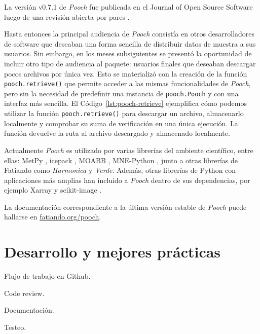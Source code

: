 La versión v0.7.1 de \emph{Pooch} fue publicada en el Journal of Open Source
Software luego de una revisión abierta por pares \citep{pooch2020}.



Hasta entonces la principal audiencia de \emph{Pooch} consistía en otros
desarrolladores de software que deseaban una forma sencilla de distribuir datos
de muestra a sus usuarios.
Sin embargo, en los meses subsiguientes se presentó la oportunidad de incluir
otro tipo de audiencia al paquete: usuarios finales que deseaban descargar
pocos archivos por única vez.
Esto se materializó con la creación de la función \texttt{pooch.retrieve()} que
permite acceder a las mismas funcionalidades de \emph{Pooch}, pero sin la
necesidad de predefinir una instancia de \texttt{pooch.Pooch} y con una
interfaz más sencilla.
El Código~\ref{lst:pooch-retrieve} ejemplifica cómo podemos utilizar la función
\texttt{pooch.retrieve()} para descargar un archivo, almacenarlo localmente
y comprobar su suma de verificación en una única ejecución.
La función devuelve la ruta al archivo descargado y almacenado localmente.

Actualmente \emph{Pooch} es utilizado por varias librerías del ambiente
científico, entre ellas: MetPy \citep{metpy}, icepack \citep{icepack}, MOABB
\citep{moabb}, MNE-Python \citep{mnepython}, junto a otras librerías de
Fatiando como \emph{Harmonica} y \emph{Verde}.
Además, otras librerías de Python con aplicaciones más amplias han incluido
a \emph{Pooch} dentro de sus dependencias, por ejemplo Xarray
\citep{xarray2017} y scikit-image \citep{skimage}.

La documentación correspondiente a la última versión estable de \emph{Pooch}
puede hallarse en \href{https://www.fatiando.org/pooch}{fatiando.org/pooch}.


\section{Desarrollo y mejores prácticas}
\label{sec:best-practices}

Flujo de trabajo en Github.

Code review.

Documentación.

Testeo.


